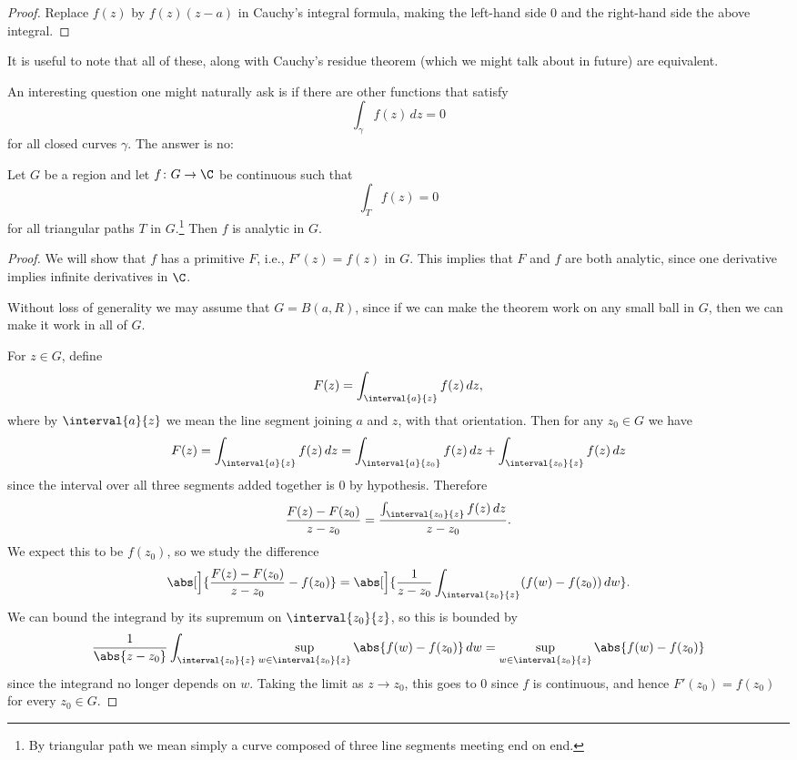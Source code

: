 \begin{proof}
	Replace $f(z)$ by $f(z) (z - a)$ in Cauchy's integral formula, making the left-hand side $0$ and the right-hand side the above integral.
\end{proof}

It is useful to note that all of these, along with Cauchy's residue theorem (which we might talk about in future) are equivalent.

An interesting question one might naturally ask is if there are other functions that satisfy
\[
	\int_\gamma f(z) \, d z = 0
\]
for all closed curves $\gamma$.
The answer is no:

\begin{theorem}\label{thm4.5}
	Let $G$ be a region and let $f \colon G \to \C$ be continuous such that
	\[
		\int_T f(z) = 0
	\]
	for all triangular paths $T$ in $G$.\footnote{By triangular path we mean simply a curve composed of three line segments meeting end on end.}
	Then $f$ is analytic in $G$.
\end{theorem}

\begin{proof}
	We will show that $f$ has a primitive $F$, i.e., $F'(z) = f(z)$ in $G$.
	This implies that $F$ and $f$ are both analytic, since one derivative implies infinite derivatives in $\C$.

	Without loss of generality we may assume that $G = B(a, R)$, since if we can make the theorem work on any small ball in $G$, then we can make it work in all of $G$.

	For $z \in G$, define
	\[
		F(z) = \int_{\interval{a}{z}} f(z) \, d z,
	\]
	where by $\interval{a}{z}$ we mean the line segment joining $a$ and $z$, with that orientation.
	Then for any $z_0 \in G$ we have
	\[
		F(z) = \int_{\interval{a}{z}} f(z) \, d z = \int_{\interval{a}{z_0}} f(z) \, d z + \int_{\interval{z_0}{z}} f(z) \, d z
	\]
	since the interval over all three segments added together is $0$ by hypothesis.
	Therefore
	\[
		\frac{F(z) - F(z_0)}{z - z_0} = \frac{\int_{\interval{z_0}{z}} f(z) \, d z}{z - z_0}.
	\]
	We expect this to be $f(z_0)$, so we study the difference
	\[
		\abs[\Big]{\frac{F(z) - F(z_0)}{z - z_0} - f(z_0)} = \abs[\Big]{ \frac{1}{z - z_0} \int_{\interval{z_0}{z}} (f(w) - f(z_0)) \, d w}.
	\]
	We can bound the integrand by its supremum on $\interval{z_0}{z}$, so this is bounded by
	\[
		\frac{1}{\abs{z - z_0}} \int_{\interval{z_0}{z}} \sup_{w \in \interval{z_0}{z}} \abs{f(w) - f(z_0)} \, d w = \sup_{w \in \interval{z_0}{z}} \abs{f(w) - f(z_0)}
	\]
	since the integrand no longer depends on $w$.
	Taking the limit as $z \to z_0$, this goes to $0$ since $f$ is continuous, and hence $F'(z_0) = f(z_0)$ for every $z_0 \in G$.
\end{proof}

